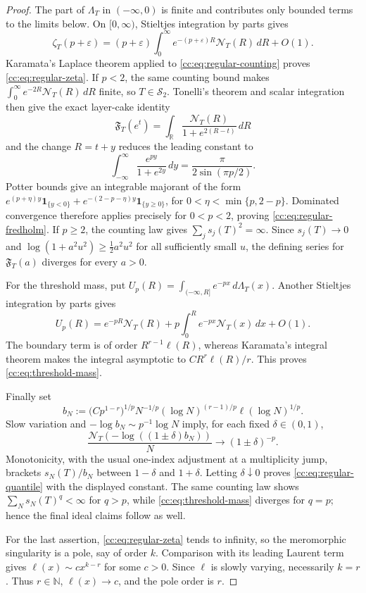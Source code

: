 \documentclass[10pt,reqno]{amsart}
\theoremstyle{plain}
\theoremstyle{definition}
\theoremstyle{remark}
\begin{document}
\begin{proof}
The part of \(\Lambda_T\) in \(({-}\infty,0)\) is finite and contributes
only bounded terms to the limits below.  On \([0,\infty)\), Stieltjes
integration by parts gives
\begin{equation}
 \zeta_T(p+\varepsilon)
 =(p+\varepsilon)\int_0^\infty
 e^{-(p+\varepsilon)R}\mathcal N_T(R)\,dR+O(1).
 \label{cc:eq:zeta-layer-cake}
\end{equation}
Karamata's Laplace theorem applied to
\eqref{cc:eq:regular-counting} proves
\eqref{cc:eq:regular-zeta}.  If \(p<2\), the same counting bound makes
\(\int_0^\infty e^{-2R}\mathcal N_T(R)\,dR\) finite, so
\(T\in\mathcal S_2\).  Tonelli's theorem and scalar integration then give
the exact layer-cake identity
\begin{equation}
 \mathfrak F_T(e^t)
 =\int_{\mathbb R}
 \frac{\mathcal N_T(R)}{1+e^{2(R-t)}}\,dR
 \label{cc:eq:fredholm-layer-cake}
\end{equation}
and the change \(R=t+y\) reduces the leading constant to
\[
 \int_{-\infty}^{\infty}\frac{e^{py}}{1+e^{2y}}\,dy
 =\frac{\pi}{2\sin(\pi p/2)}.
\]
Potter bounds give an integrable majorant of the form
\(e^{(p+\eta)y}\mathbf1_{\{y<0\}}+
e^{-(2-p-\eta)y}\mathbf1_{\{y\geq0\}}\), for
\(0<\eta<\min\{p,2-p\}\).  Dominated convergence therefore applies
precisely for \(0<p<2\), proving
\eqref{cc:eq:regular-fredholm}.
If \(p\geq2\), the counting law gives
\(\sum_js_j(T)^2=\infty\).  Since \(s_j(T)\to0\) and
\(\log(1+a^2u^2)\geq \tfrac12a^2u^2\) for all sufficiently small \(u\),
the defining series for \(\mathfrak F_T(a)\) diverges for every \(a>0\).

For the threshold mass, put
\(U_p(R)=\int_{(-\infty,R]}e^{-px}\,d\Lambda_T(x)\).  Another Stieltjes
integration by parts gives
\[
 U_p(R)=e^{-pR}\mathcal N_T(R)
 +p\int_0^R e^{-px}\mathcal N_T(x)\,dx+O(1).
\]
The boundary term is of order \(R^{r-1}\ell(R)\), whereas Karamata's
integral theorem makes the integral asymptotic to
\(C R^r\ell(R)/r\).  This proves
\eqref{cc:eq:threshold-mass}.

Finally set
\[
 b_N:=\bigl(Cp^{1-r}\bigr)^{1/p}N^{-1/p}
 (\log N)^{(r-1)/p}\ell(\log N)^{1/p}.
\]
Slow variation and \(-\log b_N\sim p^{-1}\log N\) imply, for each fixed
\(\delta\in(0,1)\),
\[
 \frac{\mathcal N_T(-\log((1\pm\delta)b_N))}{N}
 \longrightarrow (1\pm\delta)^{-p}.
\]
Monotonicity, with the usual one-index adjustment at a multiplicity jump,
brackets \(s_N(T)/b_N\) between \(1-\delta\) and \(1+\delta\).
Letting \(\delta\downarrow0\) proves
\eqref{cc:eq:regular-quantile} with the displayed constant.  The same
counting law shows \(\sum_Ns_N(T)^q<\infty\) for \(q>p\), while
\eqref{cc:eq:threshold-mass} diverges for \(q=p\); hence the final ideal
claims follow as well.

For the last assertion, \eqref{cc:eq:regular-zeta} tends to infinity, so
the meromorphic singularity is a pole, say of order \(k\).  Comparison with
its leading Laurent term gives
\(\ell(x)\sim c x^{k-r}\) for some \(c>0\).  Since \(\ell\) is slowly
varying, necessarily \(k=r\).  Thus \(r\in\mathbb N\),
\(\ell(x)\to c\), and the pole order is \(r\).
\end{proof}
\end{document}
